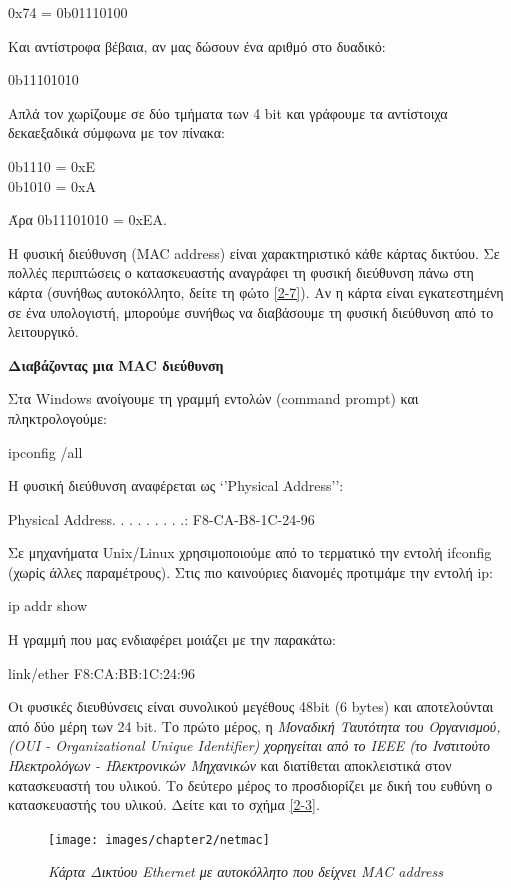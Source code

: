 \begin{inthebox}
0x74 = 0b01110100

Και αντίστροφα βέβαια, αν μας δώσουν ένα αριθμό στο δυαδικό:

0b11101010

Απλά τον χωρίζουμε σε δύο τμήματα των 4 bit και γράφουμε τα αντίστοιχα δεκαεξαδικά σύμφωνα με τον πίνακα:

0b1110 = 0xΕ \\
0b1010 = 0xΑ

Άρα 0b11101010 = 0xEA.\\
\end{inthebox}

Η φυσική διεύθυνση (MAC address) είναι χαρακτηριστικό κάθε κάρτας δικτύου. Σε πολλές περιπτώσεις ο κατασκευαστής αναγράφει τη φυσική διεύθυνση πάνω στη κάρτα (συνήθως αυτοκόλλητο, δείτε τη φώτο \ref{2-7}). Αν η κάρτα είναι εγκατεστημένη σε ένα υπολογιστή, μπορούμε συνήθως να διαβάσουμε τη φυσική διεύθυνση από το λειτουργικό.

\begin{inthebox}
\textbf{Διαβάζοντας μια MAC διεύθυνση}

Στα Windows ανοίγουμε τη γραμμή εντολών (command prompt) και πληκτρολογούμε:

\ttfamily
ipconfig /all
\normalfont

Η φυσική διεύθυνση αναφέρεται ως `'Physical Address'':

\ttfamily
Physical Address. . . . . . . . .: F8-CA-B8-1C-24-96
\normalfont

Σε μηχανήματα Unix/Linux χρησιμοποιούμε από το τερματικό την εντολή ifconfig (χωρίς άλλες παραμέτρους). Στις πιο καινούριες διανομές προτιμάμε την εντολή ip:

\ttfamily
ip addr show
\normalfont

Η γραμμή που μας ενδιαφέρει μοιάζει με την παρακάτω:

\ttfamily
link/ether F8:CA:BB:1C:24:96
\normalfont\\
\end{inthebox}

Οι φυσικές διευθύνσεις είναι συνολικού μεγέθους 48bit (6 bytes) και αποτελούνται από δύο μέρη των 24 bit. Το πρώτο μέρος, η \emph{Μοναδική Ταυτότητα του Οργανισμού, (OUI - Organizational Unique Identifier) χορηγείται από το IEEE (το Ινστιτούτο Ηλεκτρολόγων - Ηλεκτρονικών Μηχανικών} και διατίθεται αποκλειστικά στον κατασκευαστή του υλικού. Το δεύτερο μέρος το προσδιορίζει με δική του ευθύνη ο κατασκευαστής του υλικού. Δείτε και το σχήμα \ref{2-3}.

\begin{figure}[!ht]
  \centering
  \texttt{[image: images/chapter2/netmac]}
  \caption {\textsl{Κάρτα Δικτύου Ethernet με αυτοκόλλητο που δείχνει MAC address}}
\end{figure}

